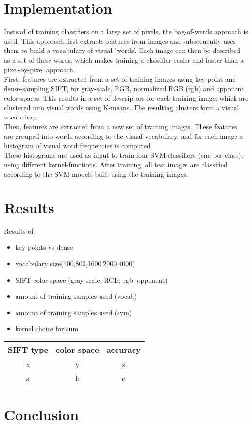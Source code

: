 \documentclass[12pt,a4paper]{article}
\begin{document}
\section{Implementation}
Instead of training classifiers on a large set of pixels, the bag-of-words approach is used. This approach first extracts features from images and subsequently uses them to build a vocabulary of visual 'words'. Each image can then be described as a set of these words, which makes training a classifier easier and faster than a pixel-by-pixel approach. \\
First, features are extracted from a set of training images using key-point and dense-sampling SIFT, for gray-scale, RGB, normalized RGB (rgb) and opponent color spaces. This results in a set of descriptors for each training image, which are clustered into visual words using K-means. The resulting clusters form a visual vocabulary. \\
Then, features are extracted from a new set of training images. These features are grouped into words according to the visual vocabulary, and for each image a histogram of visual word frequencies is computed.\\
These histograms are used as input to train four SVM-classifiers (one per class), using different kernel-functions. After training, all test images are classified according to the SVM-models built using the training images.
\section{Results}
Results of:\\
\begin{itemize}
\item key points vs dense
\item vocabulary size(400,800,1600,2000,4000)
\item SIFT color space (gray-scale, RGB, rgb, opponent)
\item amount of training samples used (vocab)
\item amount of training samples used (svm)
\item kernel choice for sum
\end{itemize}
\begin{tabular}{|c|c|c|}
\hline
SIFT type & color space & accuracy \\
\hline
x & y & z\\
a & b & c\\
\hline
\end{tabular}
\section{Conclusion}
\end{document}

